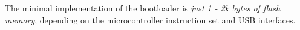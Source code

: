 The minimal implementation of the \UF bootloader is \emph{just 1 - 2k bytes of flash memory}, depending on the microcontroller instruction set and USB interfaces.

